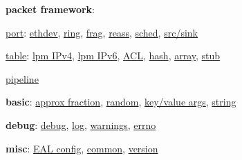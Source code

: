 \begin{DoxyItemize}
\item {\bfseries packet framework}\+:
\begin{DoxyItemize}
\item \hyperlink{rte__port_8h}{port}\+: \hyperlink{rte__port__ethdev_8h}{ethdev}, \hyperlink{rte__port__ring_8h}{ring}, \hyperlink{rte__port__frag_8h}{frag}, \hyperlink{rte__port__ras_8h}{reass}, \hyperlink{rte__port__sched_8h}{sched}, \hyperlink{rte__port__source__sink_8h}{src/sink}
\item \hyperlink{rte__table_8h}{table}\+: \hyperlink{rte__table__lpm_8h}{lpm I\+Pv4}, \hyperlink{rte__table__lpm__ipv6_8h}{lpm I\+Pv6}, \hyperlink{rte__table__acl_8h}{A\+C\+L}, \hyperlink{rte__table__hash_8h}{hash}, \hyperlink{rte__table__array_8h}{array}, \hyperlink{rte__table__stub_8h}{stub}
\item \hyperlink{rte__pipeline_8h}{pipeline}
\end{DoxyItemize}
\item {\bfseries basic}\+: \hyperlink{rte__approx_8h}{approx fraction}, \hyperlink{rte__random_8h}{random}, \hyperlink{rte__kvargs_8h}{key/value args}, \hyperlink{rte__string__fns_8h}{string}
\item {\bfseries debug}\+: \hyperlink{rte__debug_8h}{debug}, \hyperlink{rte__log_8h}{log}, \hyperlink{rte__warnings_8h}{warnings}, \hyperlink{rte__errno_8h}{errno}
\item {\bfseries misc}\+: \hyperlink{rte__eal_8h}{E\+A\+L config}, \hyperlink{rte__common_8h}{common}, \hyperlink{rte__version_8h}{version} 
\end{DoxyItemize}